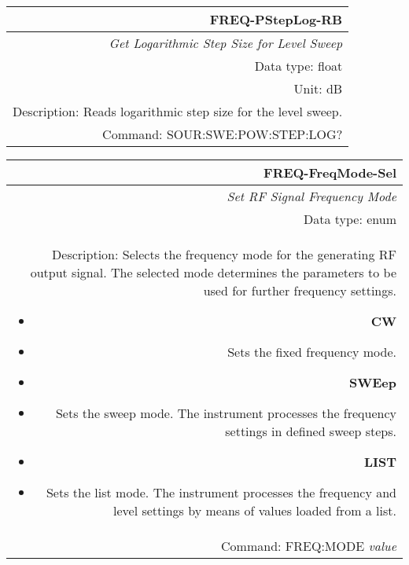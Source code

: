 \documentclass[openany]{article}
\begin{document}
		\begin{tabular}{N}
			\hline
			\bfseries FREQ-PStepLog-RB \\ \hline
			\emph{Get Logarithmic Step Size for Level Sweep} \\
			Data type: float \\
			Unit: dB \\
			Description: Reads logarithmic step size for the level sweep. \\
			Command: SOUR:SWE:POW:STEP:LOG? \\

		\end{tabular}
%
		\begin{tabular}{N}
			\hline
			\bfseries FREQ-FreqMode-Sel \\ \hline
			\emph{Set RF Signal Frequency Mode} \\
			Data type: enum \\
			Description: Selects the frequency mode for the generating RF output signal. The selected mode determines the parameters to be used for further frequency settings.\begin{itemize}[noitemsep]
				\small
				\item[] \textbf{CW} 
				\item[] Sets the fixed frequency mode.
				\item[] \textbf{SWEep}
				\item[] Sets the sweep mode. The instrument processes the frequency settings in defined sweep steps.
				\item[] \textbf{LIST}
				\item[] Sets the list mode. The instrument processes the frequency and level settings by means of values loaded from a list.
			\end{itemize} \\
			Command: FREQ:MODE \emph{value} \\

		\end{tabular}
\end{document}
